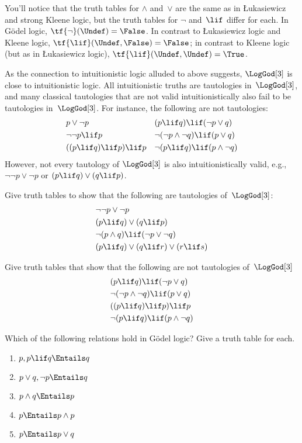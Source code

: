 \documentclass[../../../include/open-logic-section]{subfiles}
\begin{document}
You'll notice that the truth tables for $\land$ and~$\lor$ are the
same as in \L ukasiewicz and strong Kleene logic, but the truth tables
for $\lnot$ and~$\lif$ differ for each. In G\"odel logic,
$\tf{\lnot}(\Undef) = \False$. In contrast to \L ukasiewicz logic and
Kleene logic, $\tf{\lif}(\Undef, \False) = \False$; in contrast to
Kleene logic (but as in \L ukasiewicz logic), $\tf{\lif}(\Undef,
\Undef) = \True$.

As the connection to intuitionistic logic alluded to above suggests,
$\LogGod[3]$ is close to intuitionistic logic. All intuitionistic
truths are tautologies in~$\LogGod[3]$, and many classical tautologies
that are not valid intuitionistically also fail to be tautologies
in~$\LogGod[3]$. For instance, the following are not tautologies:
\begin{align*}
  & p \lor \lnot p && (p \lif q) \lif (\lnot p \lor q) \\
  & \lnot\lnot p \lif p && \lnot(\lnot p \land \lnot q) \lif (p \lor q) \\
  & ((p \lif q) \lif p) \lif p && \lnot(p \lif q) \lif (p \land \lnot q)
\end{align*}
However, not every tautology of $\LogGod[3]$ is also
intuitionistically valid, e.g., $\lnot\lnot p \lor \lnot p$ or $(p
\lif q) \lor (q \lif p)$.

\begin{prob}
  Give truth tables to show that the following are tautologies
  of~$\LogGod[3]$:
  \begin{align*}
    & \lnot\lnot p \lor \lnot p\\
    & (p \lif q) \lor (q \lif p) \\
    & \lnot(p \land q) \lif (\lnot p \lor \lnot q) \\
    & (p \lif q) \lor (q \lif r) \lor (r \lif s)
  \end{align*}
\end{prob}

\begin{prob}
  Give truth tables that show that the following are not tautologies
  of~$\LogGod[3]$
  \begin{align*}
    & (p \lif q) \lif (\lnot p \lor q) \\
    & \lnot(\lnot p \land \lnot q) \lif (p \lor q) \\
    & ((p \lif q) \lif p) \lif p \\
    & \lnot(p \lif q) \lif (p \land \lnot q)
  \end{align*}
\end{prob}

\begin{prob}
  Which of the following relations hold in G\"odel logic? Give a truth table for each.
  \begin{enumerate}
    \item $p, p \lif q \Entails q$
    \item $p \lor q, \lnot p \Entails q$
    \item $p \land q \Entails p$
    \item $p \Entails p \land p$
    \item $p \Entails p \lor q$
  \end{enumerate}
\end{prob}
\end{document}

